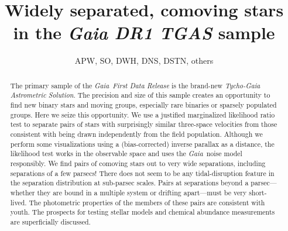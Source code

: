 \documentclass[manuscript, letterpaper]{aastex6}
\newcommand{\project}[1]{\textsl{#1}}
\newcommand{\gaia}{\project{Gaia}}
\begin{document}
\sloppy\sloppypar\raggedbottom\frenchspacing %

\title{Widely separated, comoving stars in the \textsl{Gaia DR1 TGAS} sample}
\author{APW, SO, DWH, DNS, DSTN, others}



\begin{abstract}
The primary sample of the \gaia\ \textsl{First Data Release} is the brand-new
\textsl{Tycho-Gaia Astrometric Solution}. The precision and size of this sample
creates an opportunity to find new binary stars and moving groups, especially
rare binaries or sparsely populated groups.
Here we seize this opportunity.
We use a justified marginalized likelihood ratio test to separate
pairs of stars with surprisingly similar three-space velocities from
those consistent with being drawn independently from the field
population.  Although we perform some visualizations using a
(bias-corrected) inverse parallax as a distance, the likelihood test
works in the observable space and uses the \gaia\ noise model
responsibly.
We find pairs of comoving stars out to very wide
separations, including separations of a few parsecs! There does not
seem to be any tidal-disruption feature in the separation distribution
at sub-parsec scales. Pairs at separations beyond a
parsec---whether they are bound in a multiple system or drifting
apart---must be very short-lived. The photometric properties of the
members of these pairs are consistent with youth. The prospects for
testing stellar models and chemical abundance measurements are
superficially discussed.
\end{abstract}
\end{document}

